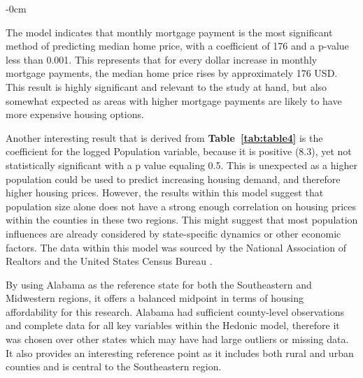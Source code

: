 \documentclass[journal,article,submit,pdftex,moreauthors]{Definitions/mdpi}
\begin{document}
\begin{table}[H]
\begin{adjustwidth}{-\extralength}{0cm}
\end{adjustwidth}
\end{table}

The model indicates that monthly mortgage payment is the most significant method of predicting median home price, with a coefficient of 176 and a p-value less than 0.001. This represents that for every dollar increase in monthly mortgage payments, the median home price rises by approximately 176 USD. This result is highly significant and relevant to the study at hand, but also somewhat expected as areas with higher mortgage payments are likely to have more expensive housing options.

Another interesting result that is derived from \textbf{Table~\ref{tab:table4}} is the coefficient for the logged Population variable, because it is positive (8.3), yet not statistically significant with a p value equaling 0.5. This is unexpected as a higher population could be used to predict increasing housing demand, and therefore higher housing prices. However, the results within this model suggest that population size alone does not have a strong enough correlation on housing prices within the counties in these two regions. This might suggest that most population influences are already considered by state-specific dynamics or other economic factors. The data within this model was sourced by the National Association of Realtors and the United States Census Bureau \citep{_2024_county, _2023_county}.
 
By using Alabama as the reference state for both the Southeastern and Midwestern regions, it offers a balanced midpoint in terms of housing affordability for this research. Alabama had sufficient county-level observations and complete data for all key variables within the Hedonic model, therefore it was chosen over other states which may have had large outliers or missing data. It also provides an interesting reference point as it includes both rural and urban counties and is central to the Southeastern region.
\end{document}
